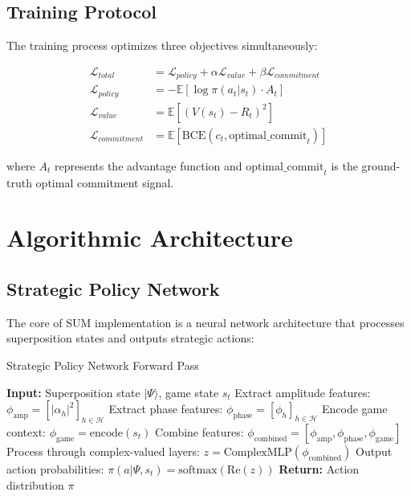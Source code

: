 \documentclass[11pt,a4paper]{article}
\begin{document}
\subsection{Training Protocol}

The training process optimizes three objectives simultaneously:

\begin{align}
\mathcal{L}_{total} &= \mathcal{L}_{policy} + \alpha \mathcal{L}_{value} + \beta \mathcal{L}_{commitment} \\
\mathcal{L}_{policy} &= -\mathbb{E}[\log \pi(a_t|s_t) \cdot A_t] \\
\mathcal{L}_{value} &= \mathbb{E}[(V(s_t) - R_t)^2] \\
\mathcal{L}_{commitment} &= \mathbb{E}[\text{BCE}(c_t, \text{optimal\_commit}_t)]
\end{align}

where $A_t$ represents the advantage function and $\text{optimal\_commit}_t$ is the ground-truth optimal commitment signal.

\section{Algorithmic Architecture}

\subsection{Strategic Policy Network}

The core of SUM implementation is a neural network architecture that processes superposition states and outputs strategic actions:

\begin{algorithm}
\caption{Strategic Policy Network Forward Pass}
\begin{algorithmic}[1]
\STATE \textbf{Input:} Superposition state $|\Psi\rangle$, game state $s_t$
\STATE Extract amplitude features: $\phi_{\text{amp}} = [|\alpha_h|^2]_{h \in \mathcal{H}}$
\STATE Extract phase features: $\phi_{\text{phase}} = [\phi_h]_{h \in \mathcal{H}}$
\STATE Encode game context: $\phi_{\text{game}} = \text{encode}(s_t)$
\STATE Combine features: $\phi_{\text{combined}} = [\phi_{\text{amp}}, \phi_{\text{phase}}, \phi_{\text{game}}]$
\STATE Process through complex-valued layers: $z = \text{ComplexMLP}(\phi_{\text{combined}})$
\STATE Output action probabilities: $\pi(a|\Psi, s_t) = \text{softmax}(\text{Re}(z))$
\STATE \textbf{Return:} Action distribution $\pi$
\end{algorithmic}
\end{algorithm}
\end{document}
